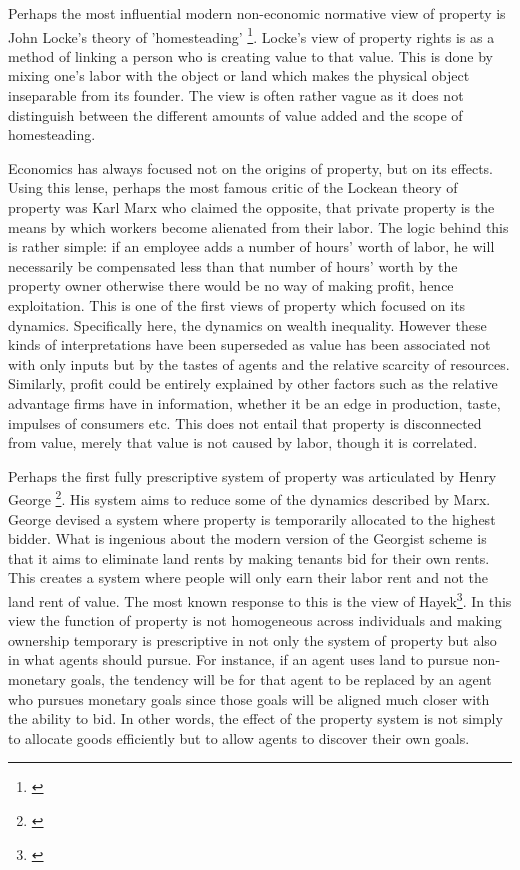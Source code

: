 Perhaps the most influential modern non-economic normative view of property is John Locke's theory of 'homesteading' \footnote{\cite{locke2014second}}. Locke's view of property rights is as a method of linking a person who is creating value to that value. This is done by mixing one's labor with the object or land which makes the physical object inseparable from its founder. The view is often rather vague as it does not distinguish between the different amounts of value added and the scope of homesteading. 

Economics has always focused not on the origins of property, but on its effects. Using this lense, perhaps the most famous critic of the Lockean theory of property was Karl Marx who claimed the opposite, that private property is the means by which workers become alienated from their labor. The logic behind this is rather simple: if an employee adds a number of hours’ worth of labor, he will necessarily be compensated less than that number of hours’ worth by the property owner otherwise there would be no way of making profit, hence exploitation. This is one of the first views of property which focused on its dynamics. Specifically here, the dynamics on wealth inequality. However these kinds of interpretations have been superseded as value has been associated not with only inputs but by the tastes of agents and the relative scarcity of resources. Similarly, profit could be entirely explained by other factors such as the relative advantage firms have in information, whether it be an edge in production, taste, impulses of consumers etc. This does not entail that property is disconnected from value, merely that value is not caused by labor, though it is correlated.

Perhaps the first fully prescriptive system of property was articulated by Henry George \footnote{\cite{progress}}. His system aims to reduce some of the dynamics described by Marx. George devised a system where property is temporarily allocated to the highest bidder. What is ingenious about the modern version of the Georgist scheme is that it aims to eliminate land rents by making tenants bid for their own rents. This creates a system where people will only earn their labor rent and not the land rent of value. The most known response to this is the view of Hayek\footnote{\cite{Fatal}}. In this view the function of property is not homogeneous across individuals and making ownership temporary is prescriptive in not only the system of property but also in what agents should pursue. For instance, if an agent uses land to pursue non-monetary goals, the tendency will be for that agent to be replaced by an agent who pursues monetary goals since those goals will be aligned much closer with the ability to bid. In other words, the effect of the property system is not simply to allocate goods efficiently but to allow agents to discover their own goals. 

